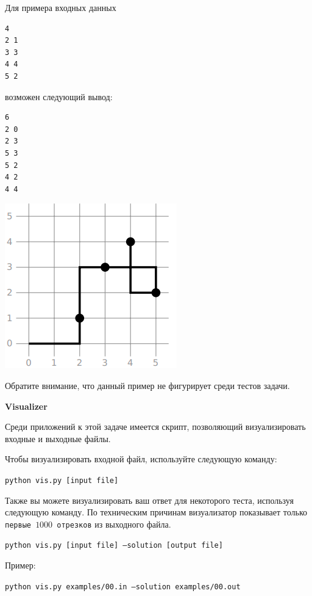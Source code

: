 Для примера входных данных
\begin{verbatim}
4
2 1
3 3
4 4
5 2
\end{verbatim}

возможен следующий вывод:

\begin{verbatim}
6
2 0
2 3
5 3
5 2
4 2
4 4
\end{verbatim}

\begin{center}
\includegraphics[scale=0.5]{1.png}
\end{center}

Обратите внимание, что данный пример не фигурирует среди тестов задачи.

\textbf{Visualizer}

Среди приложений к этой задаче имеется скрипт, позволяющий визуализировать
входные и выходные файлы.

Чтобы визуализировать входной файл, используйте следующую команду:

\texttt{python vis.py [input file]}

Также вы можете визуализировать ваш ответ для некоторого теста, используя
следующую команду. По техническим причинам визуализатор показывает только
\texttt{первые $1000$ отрезков} из выходного файла.


\texttt{python vis.py [input file] --solution [output file]}

Пример:

\texttt{python vis.py examples/00.in --solution examples/00.out}
